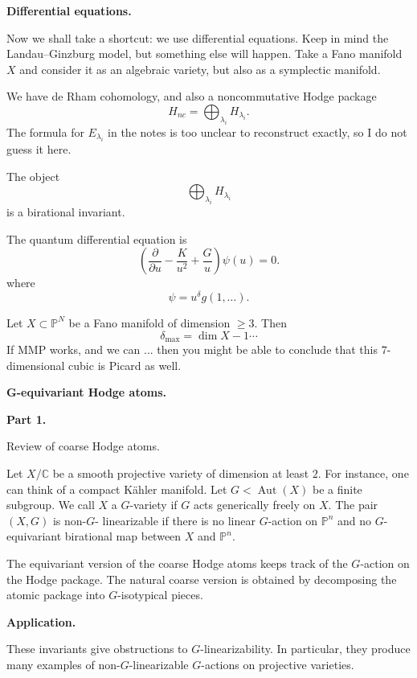 \medskip\noindent
{\bf Differential equations.}

Now we shall take a shortcut:
we use differential equations.
Keep in mind the
Landau--Ginzburg model,
but something else will happen.
Take a Fano manifold $X$ and
consider it as an algebraic
variety, but also as a symplectic
manifold.

We have de Rham cohomology, and also
a noncommutative Hodge package
$$
H_{nc}=
\bigoplus_{\lambda_i}
H_{\lambda_i}.
$$
The formula for $E_{\lambda_i}$ in
the notes is too unclear to
reconstruct exactly, so I do not
guess it here.

\begin{theorem}
The object
$$
\bigoplus_{\lambda_i}
H_{\lambda_i}
$$
is a birational invariant.
\end{theorem}

The quantum differential equation is
$$
\left(
\frac{\partial}{\partial u}
-\frac{K}{u^2}
+\frac{G}{u}
\right)
\psi(u)=0.
$$
where
$$
\psi=u^{\delta}g(1,\dots).
$$

\begin{theorem}
\label{theorem-let-x2}
Let $X \subset \mathbb{P}^N$
be a Fano manifold of dimension
$\geq 3$.
Then
$$
\delta_{\max}
=
\dim X -1
\cdots
$$
If MMP works, and we can
...
then you might be able to conclude
that this $7$-dimensional cubic is
Picard as well.
\end{theorem}

\medskip\noindent
{\bf G-equivariant Hodge atoms.}

\medskip\noindent
{\bf Part 1.}

Review of coarse Hodge atoms.

\medskip\noindent
Let $X/\mathbb{C}$ be a smooth
projective variety of dimension at
least $2$.
For instance, one can think of a
compact K\"ahler manifold.
Let $G<\operatorname{Aut}(X)$ be a
finite subgroup.
We call $X$ a $G$-variety if $G$
acts generically freely on $X$.
The pair $(X,G)$ is non-$G$-
linearizable if there is no linear
$G$-action on $\mathbb{P}^n$ and no
$G$-equivariant birational map
between $X$ and $\mathbb{P}^n$.

\medskip\noindent
The equivariant version of the
coarse Hodge atoms keeps track of
the $G$-action on the Hodge
package.
The natural coarse version is
obtained by decomposing the atomic
package into $G$-isotypical
pieces.

\medskip\noindent
{\bf Application.}

These invariants give obstructions
to $G$-linearizability.
In particular, they produce many
examples of non-$G$-linearizable
$G$-actions on projective
varieties.

